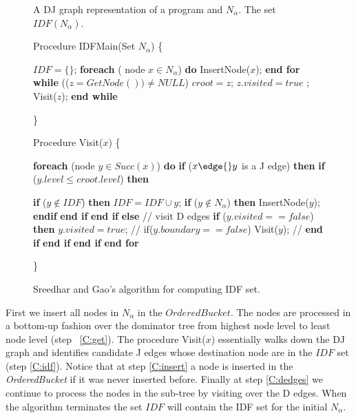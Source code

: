 \begin{figure}[!ht]
\centering
\begin{minipage}[t]{5in}
 A DJ graph representation of a program and $N_{\alpha}$.
 The set $IDF(N_{\alpha})$.

Procedure IDFMain(Set $N_{\alpha}$) 
\{
\begin{code}
 $IDF = \{ \}$;
 {\bf foreach} ( node $x \in  N_{\alpha}$) {\bf do}
    InsertNode($x$);
 {\bf end for}
 {\bf while} (($z = GetNode()) \neq NULL$)  \label{C:get}
   $croot = z$;
   $z.visited = true$ ;
   Visit($z$);
 {\bf end while}
\end{code}
\} 

Procedure Visit($x$)
\{
\begin{code}
 {\bf foreach} (node $y \in  Succ(x)$) {\bf do}
  {\bf if} ($x \edge{} y$ is a  J edge) {\bf then}
   {\bf if} ($y.level \leq croot.level$) {\bf then}

     {\bf if} ($y \not \in IDF$) {\bf then}
        $IDF = IDF \cup {y}$;   \label{C:idf}
        {\bf if} ($y \not  \in N_{\alpha}$) {\bf then}
          InsertNode($y$); \label{C:insert}
        {\bf endif}
     {\bf end if}
  {\bf end if}
 {\bf else} // visit D edges 
   {\bf if} ($y.visited == false $) {\bf then}
    $y.visited = true$;
    // if($y.boundary == false$)   \label{C:cached}
     Visit($y$); \label{C:dedges}
 // {\bf end if}
   {\bf end if}
  {\bf end if}
 {\bf end for}
\end{code}
\} 
\end{minipage}
\caption{Sreedhar and Gao's algorithm for computing IDF set.}
\label{F:IDFMain}
\end{figure}

First we insert all nodes in $N_{\alpha}$ in the $OrderedBucket$. The nodes are processed
in a bottom-up fashion over the dominator tree from highest node level to least node level
(step ~\ref{C:get}). The procedure Visit($x$) essentially walks down the  DJ graph 
and identifies candidate J edges whose destination node are in the $IDF$ set (step \ref{C:idf}).
Notice that at step \ref{C:insert} a node is inserted in the {\it OrderedBucket} if it was
never inserted before. Finally at step \ref{C:dedges} we continue to process the nodes
in the sub-tree by visiting over the D edges. When the algorithm terminates the 
set $IDF$ will contain the IDF set for the initial $N_{\alpha}$.

